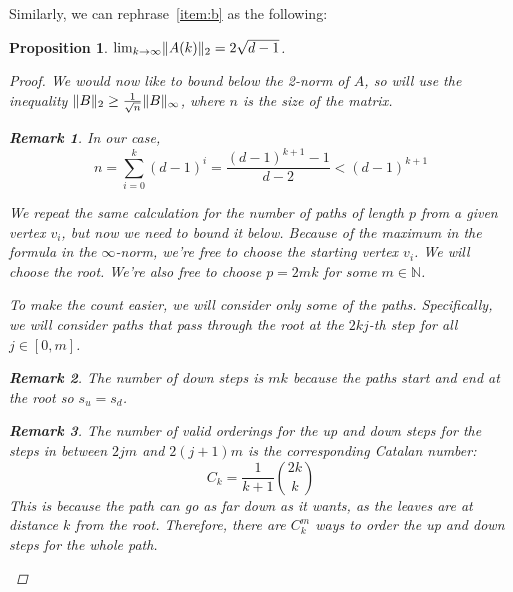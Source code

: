 \documentclass{amsart}
\theoremstyle{plain}
\newtheorem*{proposition}{\textbf{Proposition}}
\theoremstyle{definition}
\newtheorem*{rk}{\textbf{Remark}}
\newcommand{\N}{\mathbb{N}}
\DeclarePairedDelimiter{\norm}{\lVert}{\rVert}
\begin{document}
    Similarly, we can rephrase~\ref{item:b} as the following:
    \begin{proposition}
        $\lim_{k \to \infty} \norm{A(k)}_2 = 2 \sqrt{d - 1}$.

        \begin{proof}
            We would now like to bound \emph{below} the 2-norm of $A$, so will use the inequality
            $\norm{B}_2 \geq \frac{1}{\sqrt{n}} \norm{B}_\infty$, where $n$ is the size of the matrix.
            \begin{rk}
                In our case,
                \begin{equation*}
                    n = \sum_{i=0}^{k} (d-1)^i = \frac{(d-1)^{k+1} - 1}{d-2} < (d-1)^{k+1}
                \end{equation*}
            \end{rk}

            We repeat the same calculation for the number of paths of length $p$ from a given vertex $v_i$,
            but now we need to bound it below.
            Because of the maximum in the formula in the $\infty$-norm,
            we're free to choose the starting vertex $v_i$.
            We will choose the root.
            We're also free to choose $p = 2mk$ for some $m \in \N$.

            To make the count easier, we will consider only some of the paths.
            Specifically, we will consider paths that pass through the root
            at the $2kj$-th step for all $j \in [0, m]$.

            \begin{rk}
                The number of \emph{down} steps is $mk$
                because the paths start and end at the root so $s_u = s_d$.
            \end{rk}

            \begin{rk}
                The number of valid orderings for the \emph{up} and \emph{down}
                steps for the steps in between
                $2jm$ and $2(j+1)m$ is
                the corresponding \emph{Catalan number}:
                \begin{equation*}
                    C_{k} = \frac{1}{k+1} \binom{2k}{k}
                \end{equation*}
                This is because the path can go as far down as it wants,
                as the leaves are at distance $k$ from the root.
                Therefore, there are $C_k^m$ ways to order the
                \emph{up} and \emph{down} steps for the whole path.
            \end{rk}


\end{proof}
\end{proposition}
\end{document}
